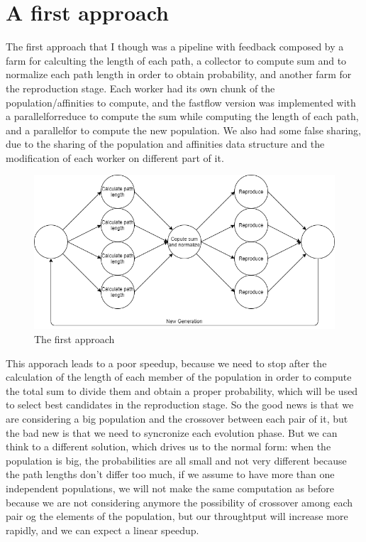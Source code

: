 \documentclass{article}
\begin{document}
    \section{A first approach}\label{sec:s2}
	The first approach that I though was a pipeline with feedback composed by a farm for calculting the length of each path, a collector to compute sum and to normalize each path length in order to obtain probability, and another farm for the reproduction stage. Each worker had its own chunk of the population/affinities to compute, and the fastflow version was implemented with a parallelforreduce to compute the sum while computing the length of each path, and a parallelfor to compute the new population. We also had some false sharing, due to the sharing of the population and affinities data structure and the modification of each worker on different part of it.
    \begin{figure}
        \includegraphics[width=\linewidth]{img/first.png}
        \caption{The first approach}
        \label{fig:first}
    \end{figure}
    This apporach leads to a poor speedup, because we need to stop after the calculation of the length of each member of the population in order to compute the total sum to divide them and obtain a proper probability, which will be used to select best candidates in the reproduction stage. So the good news is that we are considering a big population and the crossover between each pair of it, but the bad new is that we need to syncronize each evolution phase. But we can think to a different solution, which drives us to the normal form: when the population is big, the probabilities are all small and not very different because the path lengths don't differ too much, if we assume to have more than one independent populations, we will not make the same computation as before because we are not considering anymore the possibility of crossover among each pair og the elements of the population, but our throughtput will increase more rapidly, and we can expect a linear speedup.
\end{document}
